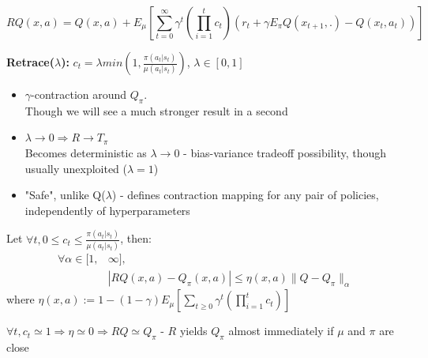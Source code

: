 \documentclass{beamer}
\begin{document}
\begin{frame}[t]

\begin{equation*}
R Q (x,a) = Q(x,a) + E_\mu \left[ \sum_{t=0}^\infty \gamma^t \left( \prod_{i=1}^{t} c_t \right) \left( r_t + \gamma E_\pi Q (x_{t+1},.) - Q(x_t,a_t) \right) \right]
\end{equation*}

\textbf{Retrace($\lambda$):} $c_t = \lambda min \left(1, \frac{\pi(a_t | s_t) }{\mu(a_t | s_t)} \right)$, $\lambda \in [0,1]$\\

\begin{itemize}
\item $\gamma$-contraction around $Q_\pi$.\\ Though we will see a much stronger result in a second\\

\item $\lambda \rightarrow 0 \Rightarrow R \rightarrow T_\pi$\\
Becomes deterministic as $\lambda \rightarrow 0$ - bias-variance tradeoff possibility, though usually unexploited ($\lambda = 1$)

\item "Safe", unlike Q($\lambda$) - defines contraction mapping for any pair of policies, independently of hyperparameters
\end{itemize}

\end{frame}

\begin{frame}
\begin{theorem}
Let $\forall t, 0  \leq c_t \leq \frac{\pi(a_t|s_t) }{\mu(a_t | s_t)}$, then:
\begin{align*}
 \forall \alpha \in  [1, & \infty],\\
& |RQ(x,a) - Q_\pi(x,a)| \leq \eta(x,a) \parallel Q - Q_\pi  \parallel_\alpha
\end{align*}
where $\eta(x,a) := 1 - (1-\gamma) E_\mu \left[ \sum_{t \geq 0} \gamma^t \left( \prod_{i=1}^t c_t \right) \right]$
\end{theorem}

 $\forall t, c_t \simeq 1 \Rightarrow \eta \simeq 0 \Rightarrow R Q \simeq Q_\pi$ - $R$ yields $Q_\pi$ almost immediately if $\mu$ and $\pi$ are close\\
 
\vspace{3mm}
 
\end{frame}
\end{document}
